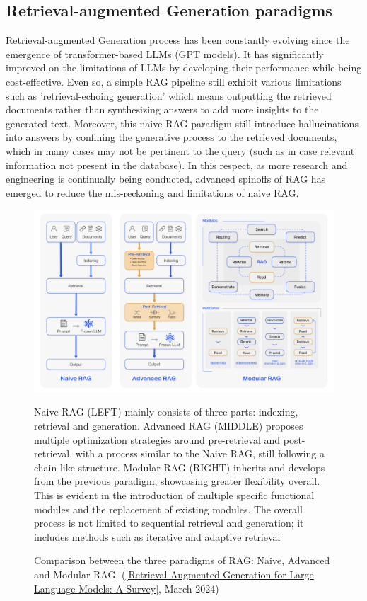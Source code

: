 \subsection{Retrieval-augmented Generation paradigms}
Retrieval-augmented Generation process has been constantly evolving since the emergence of transformer-based LLMs (GPT models). It has significantly improved on the limitations of LLMs by developing their performance while being cost-effective. Even so, a simple RAG pipeline still exhibit various limitations such as 'retrieval-echoing generation' which means outputting the retrieved documents rather than synthesizing answers to add more insights to the generated text. Moreover, this naive RAG paradigm still introduce hallucinations into answers by confining the generative process to the retrieved documents, which in many cases may not be pertinent to the query (such as in case relevant information not present in the database). In this respect, as more research and engineering is continually being conducted, advanced spinoffs of RAG has emerged to reduce the mis-reckoning and limitations of naive RAG.
\begin{figure}[htbp]
    \centering
    \includegraphics[width=\linewidth]{./figures/RAG_FrameCompre_eng.png}
    \caption{Comparison between the three paradigms of RAG: Naive, Advanced and Modular RAG. (\href{https://arxiv.org/html/2312.10997v5}{[Retrieval-Augmented Generation for Large Language Models: A Survey]}, March 2024)}
    \begin{flushleft}
        \small Naive RAG (LEFT)  mainly consists of three parts: indexing, retrieval and generation. Advanced RAG (MIDDLE) proposes multiple optimization strategies around pre-retrieval and post-retrieval, with a process similar to the Naive RAG, still following a chain-like structure. Modular RAG (RIGHT) inherits and develops from the previous paradigm, showcasing greater flexibility overall. This is evident in the introduction of multiple specific functional modules and the replacement of existing modules. The overall process is not limited to sequential retrieval and generation; it includes methods such as iterative and adaptive retrieval
    \end{flushleft}
\end{figure}\newpage
